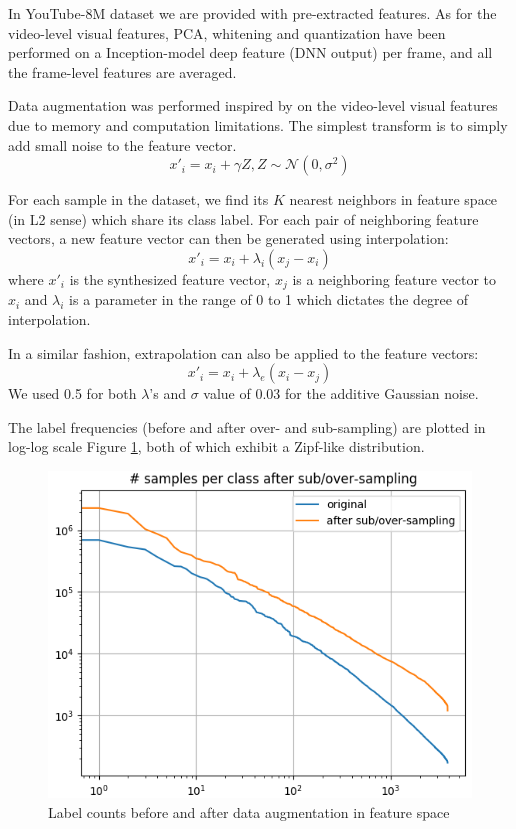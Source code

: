 \documentclass[runningheads]{llncs}
\begin{document}
In YouTube-8M dataset we are provided with pre-extracted features.
As for the video-level visual features, PCA, whitening and quantization have been performed on a Inception-model deep feature (DNN output) per frame, and all the frame-level features are averaged.

Data augmentation was performed inspired by \cite{devries2017} on the video-level visual features due to memory and computation limitations.
The simplest transform is to simply add small noise to the feature vector.
\begin{equation}
x'_i = x_i + \gamma Z, Z \sim \mathcal{N}(0, \sigma^2)
\end{equation}

For each sample in the dataset, we find its $K$ nearest neighbors in feature space (in L2 sense) which share its class label.
For each pair of neighboring feature vectors, a new feature vector can then be generated using interpolation:
\begin{equation}
x'_i = x_i + \lambda_i (x_j - x_i)
\end{equation}
where $x'_i$ is the synthesized feature vector, $x_j$ is a neighboring feature vector to $x_i$ and $\lambda_i$ is a parameter in the range of 0 to 1 which dictates the degree of interpolation.

In a similar fashion, extrapolation can also be applied to the feature vectors:
\begin{equation}
x'_i = x_i + \lambda_e (x_i - x_j)
\end{equation}
We used 0.5 for both $\lambda$'s and $\sigma$ value of 0.03 for the additive Gaussian noise.

The label frequencies (before and after over- and sub-sampling) are plotted in log-log scale Figure \ref{fig:numsamples}, both of which exhibit a Zipf-like distribution.
\begin{figure}
  \includegraphics[width=\linewidth]{../figures/new_num_samples_per_class_cropped.png}
  \caption{Label counts before and after data augmentation in feature space}
  \label{fig:numsamples}
\end{figure}
\end{document}
